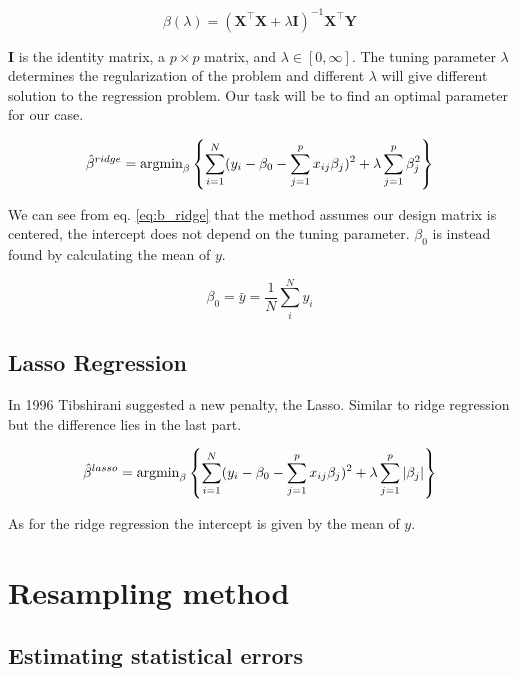 \documentclass[a4paper,12pt, english]{article}
\begin{document}
\begin{equation} \label{eq:beta}
\hat{\beta}(\lambda) = (\mathbf{X}^{\top}\mathbf{X} + \lambda\mathbf{I})^{-1}\mathbf{X}^{\top}\mathbf{Y}
\end{equation}

$\mathbf{I}$ is the identity matrix, a $p \times p$ matrix, and $\lambda \in [0, \infty]$. The tuning parameter $\lambda$ determines the regularization of the problem and different $\lambda$ will give different solution to the regression problem. Our task will be to find an optimal parameter for our case.

\begin{equation} \label{eq:b_ridge}
\hat{\beta}^{ridge} = \textnormal{argmin}_{\beta} \left \{ \sum_{i=1}^{N} (y_i - \beta_0 - \sum_{j=1}^{p} x_{ij} \beta_j)^2 + \lambda \sum_{j=1}^{p} \beta_j^2 \right \}
\end{equation}

We can see from eq. \ref{eq:b_ridge} that the method assumes our design matrix is centered, the intercept does not depend on the tuning parameter. $\beta_0$ is instead found by calculating the mean of $y$.

\begin{equation}
\beta_0 = \bar{y} = \frac{1}{N} \sum_i^N y_i
\end{equation}

\subsection*{Lasso Regression}

In 1996 Tibshirani suggested a new penalty, the Lasso. Similar to ridge regression but the difference lies in the last part.  

\begin{equation}
\hat{\beta}^{lasso} = \textnormal{argmin}_{\beta} \left \{ \sum_{i=1}^{N} (y_i - \beta_0 - \sum_{j=1}^{p} x_{ij} \beta_j)^2 + \lambda \sum_{j=1}^{p} |\beta_j| \right \}
\end{equation}

As for the ridge regression the intercept is given by the mean of $y$.

\section*{Resampling method}

\subsection*{Estimating statistical errors}
\end{document}
